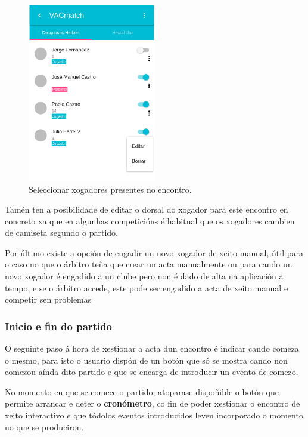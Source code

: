     \begin{figure}[h!]
      \begin{center}
      \includegraphics[width=0.5\textwidth]{./img/demo/9_calllist.png}
      \caption{Seleccionar xogadores presentes no encontro.}
      \label{fig:design:callplayers}
      \end{center}
    \end{figure}

      Tamén ten a posibilidade de editar o dorsal do xogador para este encontro 
en concreto xa que en algunhas competicións é habitual que os xogadores cambien 
de camiseta segundo o partido.

      Por último existe a opción de engadir un novo xogador de xeito 
manual, útil para o caso no que o árbitro teña que crear un acta manualmente ou 
para cando un novo xogador é engadido a un clube pero non é dado de alta na 
aplicación a tempo, e se o árbitro accede, este pode ser engadido a acta de 
xeito manual e competir sen problemas

      \subsubsection{Inicio e fin do partido}
      O seguinte paso á hora de xestionar a acta dun encontro é indicar cando 
comeza o mesmo, para isto o usuario dispón de un botón que só se mostra cando 
non comezou aínda dito partido e que se encarga de introducir un evento de 
comezo.

      No momento en que se comece o partido, atoparase dispoñible o botón 
que permite arrancar e deter o \textbf{cronómetro}, co fin de poder xestionar o 
encontro de xeito interactivo e que tódolos eventos introducidos leven 
incorporado o momento no que se produciron.

